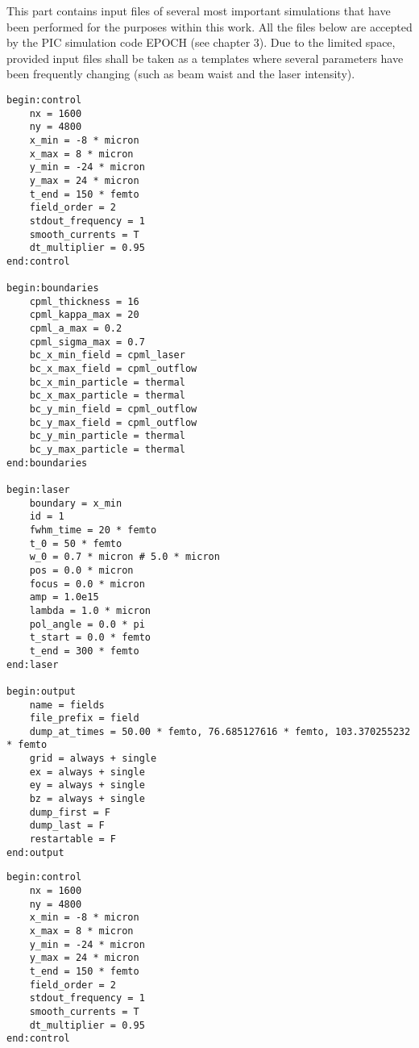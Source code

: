 This part contains input files of several most important simulations that have been performed for the purposes within this work. All the files below are accepted by the PIC simulation code EPOCH (see chapter 3). Due to the limited space, provided input files shall be taken as a templates where several parameters have been frequently changing (such as beam waist and the laser intensity).

\setlength{\columnsep}{30pt}
\begin{multicols}{2}
\begin{lstlisting}[style=CXX, caption={Input file for evaluation of the implemented algorithm for tight-focusing (chapter 4). In this case, the laser beam propagates according to the Maxwell consistent approach.\vspace{1mm}}]
begin:control
	nx = 1600
	ny = 4800
	x_min = -8 * micron
	x_max = 8 * micron
	y_min = -24 * micron
	y_max = 24 * micron
	t_end = 150 * femto
	field_order = 2
	stdout_frequency = 1
	smooth_currents = T
	dt_multiplier = 0.95
end:control

begin:boundaries
	cpml_thickness = 16
	cpml_kappa_max = 20
	cpml_a_max = 0.2
	cpml_sigma_max = 0.7
	bc_x_min_field = cpml_laser
	bc_x_max_field = cpml_outflow
	bc_x_min_particle = thermal
	bc_x_max_particle = thermal
	bc_y_min_field = cpml_outflow
	bc_y_max_field = cpml_outflow
	bc_y_min_particle = thermal
	bc_y_max_particle = thermal
end:boundaries

begin:laser
	boundary = x_min
	id = 1
	fwhm_time = 20 * femto
	t_0 = 50 * femto
	w_0 = 0.7 * micron # 5.0 * micron
	pos = 0.0 * micron
	focus = 0.0 * micron
	amp = 1.0e15
	lambda = 1.0 * micron
	pol_angle = 0.0 * pi
	t_start = 0.0 * femto
	t_end = 300 * femto
end:laser

begin:output
	name = fields
	file_prefix = field
	dump_at_times = 50.00 * femto, 76.685127616 * femto, 103.370255232 * femto
	grid = always + single
	ex = always + single
	ey = always + single
	bz = always + single
	dump_first = F
	dump_last = F
	restartable = F
end:output
\end{lstlisting}

\begin{lstlisting}[style=CXX, caption={Input file for identifying the conditions for which the propagation of the laser beam under the paraxial approximation is valid (chapter 4).\vspace{1mm}}]
begin:control
	nx = 1600
	ny = 4800
	x_min = -8 * micron
	x_max = 8 * micron
	y_min = -24 * micron
	y_max = 24 * micron
	t_end = 150 * femto
	field_order = 2
	stdout_frequency = 1
	smooth_currents = T
	dt_multiplier = 0.95
end:control


\end{lstlisting}
\end{multicols}
